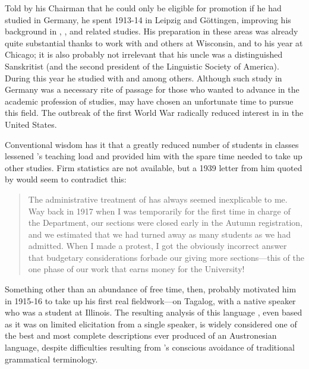 Told by his Chairman that he could only be eligible for promotion if
he had studied in Germany, he spent 1913-14 in {Leipzig} and Göttingen,
improving his background in , , and related
studies. His preparation in these areas was already quite substantial
thanks to work with {\Prokosch} and others at Wisconsin, and to his year
at Chicago; it is also probably not irrelevant that his uncle 
 was a distinguished Sanskritist (and the second president
of the {Linguistic Society of America}). During this year he studied
with {\Leskien} and {\Brugmann} among others. Although such study in Germany
was a necessary rite of passage for those who wanted to advance in the
academic profession of  studies, {\Bloomfield} may have chosen an
unfortunate time to pursue this field. The outbreak of the first World
War radically reduced interest in  in the United States.

Conventional wisdom has it that a greatly reduced number of students
in  classes lessened {\Bloomfield}'s teaching load and provided him
with the spare time needed to take up other studies. Firm statistics
are not available, but a 1939 letter from him quoted by
\citet[41]{hall90:bloomfield.bio} would seem to contradict this:
\begin{quotation}
  The administrative treatment of  has always seemed
  inexplicable to me. Way back in 1917 when I was temporarily for the
  first time in charge of the Department, our sections were closed
  early in the Autumn registration, and we estimated that we had
  turned away as many students as we had admitted. When I made a
  protest, I got the obviously incorrect answer that budgetary
  considerations forbade our giving more sections---this of the one
  phase of our work that earns money for the University!
\end{quotation}
Something other than an abundance of free time, then, probably
motivated him in 1915-16 to take up his first real fieldwork—on
Tagalog, with a native speaker who was a student at Illinois. The
resulting analysis of this language \citep{bloomfield16:tagalog},
even based as it was on limited elicitation from a single speaker, is
widely considered one of the best and most complete descriptions ever
produced of an Austronesian language, despite difficulties resulting
from {\Bloomfield}'s conscious avoidance of traditional grammatical
terminology.

